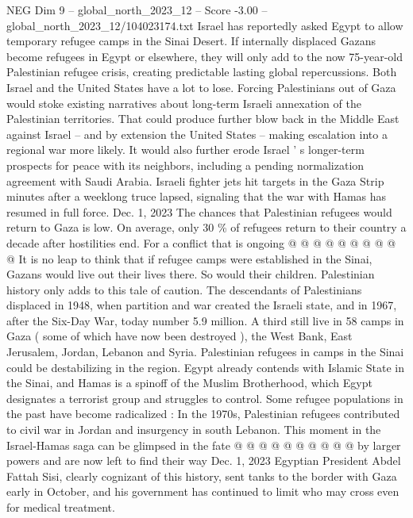 \begin{textsample}{NEG Dim 9 – global\_north\_2023\_12 – Score -3.00 – global\_north\_2023\_12/104023174.txt}  \label{ex:f9_neg_287}
Israel has reportedly asked Egypt to allow temporary refugee camps in the Sinai Desert.
If internally displaced Gazans become refugees in Egypt or elsewhere, they will only add to the now 75-year-old Palestinian refugee crisis, creating predictable lasting global repercussions.
Both Israel and the United States have a lot to lose.
Forcing Palestinians out of Gaza would stoke existing narratives about long-term Israeli annexation of the Palestinian territories.
That could produce further blow back in the Middle East against Israel -- and by extension the United States -- making escalation into a regional war more likely.
It would also further erode Israel ' s longer-term prospects for peace with its neighbors, including a pending normalization agreement with Saudi Arabia.
Israeli fighter jets hit targets in the Gaza Strip minutes after a weeklong truce lapsed, signaling that the war with Hamas has resumed in full force.
Dec. 1, 2023 The chances that Palestinian refugees would return to Gaza is low.
On average, only 30 \% of refugees return to their country a decade after hostilities end.
For a conflict that is ongoing @ @ @ @ @ @ @ @ @ @ It is no leap to think that if refugee camps were established in the Sinai, Gazans would live out their lives there.
So would their children.
Palestinian history only adds to this tale of caution.
The descendants of Palestinians displaced in 1948, when partition and war created the Israeli state, and in 1967, after the Six-Day War, today number 5.9 million.
A third still live in 58 camps in Gaza ( some of which have now been destroyed ), the West Bank, East Jerusalem, Jordan, Lebanon and Syria.
Palestinian refugees in camps in the Sinai could be destabilizing in the region.
Egypt already contends with Islamic State in the Sinai, and Hamas is a spinoff of the Muslim Brotherhood, which Egypt designates a terrorist group and struggles to control.
Some refugee populations in the past have become radicalized : In the 1970s, Palestinian refugees contributed to civil war in Jordan and insurgency in south Lebanon.
This moment in the Israel-Hamas saga can be glimpsed in the fate @ @ @ @ @ @ @ @ @ @ by larger powers and are now left to find their way Dec. 1, 2023 Egyptian President Abdel Fattah Sisi, clearly cognizant of this history, sent tanks to the border with Gaza early in October, and his government has continued to limit who may cross even for medical treatment.

\end{textsample}
